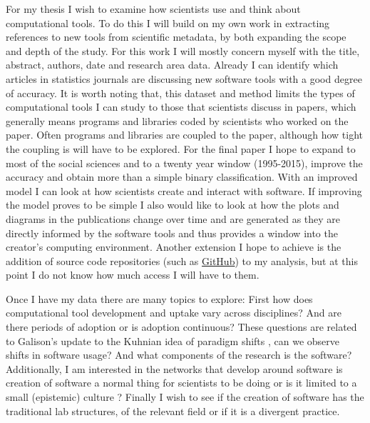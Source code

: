 \documentclass[12pt, a4paper]{article}
\begin{document}
For my thesis I wish to examine how scientists use and think about computational tools. To do this I will build on my own work in extracting references to new tools from scientific metadata, by both expanding the scope and depth of the study. For this work I will mostly concern myself with the title, abstract, authors, date and research area data. Already I can identify which articles in statistics journals are discussing new software tools with a good degree of accuracy. It is worth noting that, this dataset and method limits the types of computational tools I can study to those that scientists discuss in papers, which generally means programs and libraries coded by scientists who worked on the paper. Often programs and libraries are coupled to the paper, although how tight the coupling is will have to be explored. For the final paper I hope to expand to most of the social sciences and to a twenty year window (1995-2015), improve the accuracy and obtain more than a simple binary classification. With an improved model I can look at how scientists create and interact with software. If improving the model proves to be simple I also would like to look at how the plots and diagrams in the publications change over time and are generated as they are directly informed by the software tools and thus provides a window into the creator's computing environment. Another extension I hope to achieve is the addition of source code repositories (such as \href{http://github.com}{GitHub}) to my analysis, but at this point I do not know  how much access I will have to them.

Once I have my data there are many topics to explore: First how does computational tool development and uptake vary across disciplines? And are there periods of adoption or is adoption continuous? These questions are related to Galison's update \citep{galison1997image} to the Kuhnian idea of paradigm shifts \citep{kuhn1963structure}, can we observe shifts in software usage? And what components of the research is the software? Additionally, I am interested in the networks that develop around software is creation of software a normal thing for scientists to be doing or is it limited to a small (epistemic) culture \citep{cetina2009epistemic}? Finally I wish to see if the creation of software has the traditional lab structures, of the relevant field or if it is a divergent practice.

\newpage
{}
%

\end{document}
